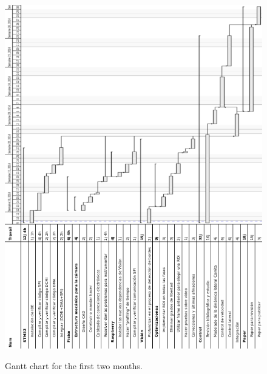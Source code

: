 \begin{figure}[ht!]
\begin{center}
\includegraphics[height=1.3\textwidth]{fig/ganttscaled}\\
\caption{Gantt chart for the first two months.}
\label{fig_ganttA}
\end{center}
\end{figure}
